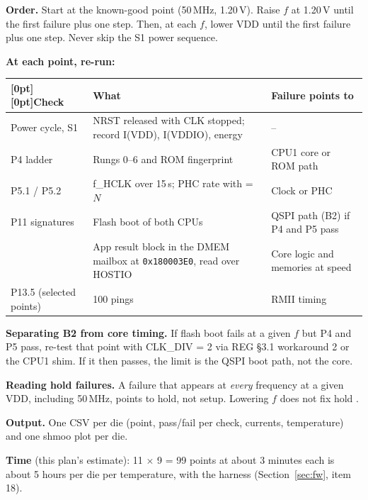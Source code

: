 \documentclass[10pt,a4paper]{article}
\newcommand\src{\leavevmode\begingroup\color{srcgray}\srcaux}
\newcommand\srcaux[1]{\srcraw{#1}\endgroup}
\newcommand\hd[1]{\textbf{#1}}
\begin{document}
\textbf{Order.} Start at the known-good point (50\,MHz, 1.20\,V). Raise $f$ at 1.20\,V until the first failure plus one step. Then, at each $f$, lower VDD until the first failure plus one step. Never skip the S1 power sequence.

\textbf{At each point, re-run:}
{\small
\begin{longtable}{@{}P{3.0cm}P{7.3cm}P{5.8cm}@{}}
\toprule
{}[0pt][0pt]\hd{Check} & \hd{What} & \hd{Failure points to}\\
\midrule
\endhead
Power cycle, S1 & NRST released with CLK stopped; record I(VDD), I(VDDIO), energy & -- \\
P4 ladder & Rungs 0--6 and ROM fingerprint & CPU1 core or ROM path \\
P5.1 / P5.2 & f\_HCLK over 15\,s; PHC rate with  = $N$ & Clock or PHC \\
P11 signatures & Flash boot of both CPUs & QSPI path (B2) if P4 and P5 pass \\
 & App result block in the DMEM mailbox at \texttt{0x180003E0}, read over HOSTIO & Core logic and memories at speed \\
P13.5 (selected points) & 100 pings & RMII timing \\
\bottomrule
\end{longtable}\addtocounter{table}{-1}}

\textbf{Separating B2 from core timing.} If flash boot fails at a given $f$ but P4 and P5 pass, re-test that point with CLK\_DIV = 2 via REG \S3.1 workaround 2 or the CPU1 shim. If it then passes, the limit is the QSPI boot path, not the core.

\textbf{Reading hold failures.} A failure that appears at \emph{every} frequency at a given VDD, including 50\,MHz, points to hold, not setup. Lowering $f$ does not fix hold \src{REG:451-456}.

\textbf{Output.} One CSV per die (point, pass/fail per check, currents, temperature) and one shmoo plot per die.

\textbf{Time} (this plan's estimate): 11 $\times$ 9 = 99 points at about 3 minutes each is about 5 hours per die per temperature, with the harness (Section~\ref{sec:fw}, item 18).

\end{document}
